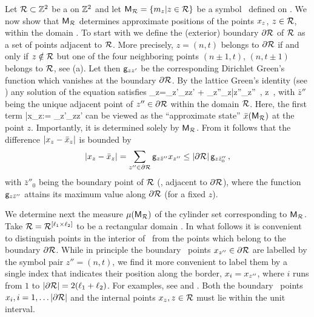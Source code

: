\documentclass[12pt]{iopart}
\begin{document}
Let $\mathcal{R}\subset\mathbb{Z}^2$ be a  on $\mathbb{Z}^2$ and
let ${\mathsf{M}_{\mathcal{R}}}=\{{m_{z}}| z\in \mathcal{R}\}$ be a symbol \brick\ defined on \R. We
now show that ${\mathsf{M}_{\mathcal{R}}}$ determines approximate positions of the points
$x_z$, $z\in\mathcal{R}$, within the domain \R. To start with we define the
(exterior) boundary $\partial\mathcal{R}$ of $\mathcal{R}$ as a set of points adjacent to
$\mathcal{R}$. More precisely, $z=(n,t)$ belongs to $\partial\mathcal{R}$ if and only if
$z\notin \mathcal{R}$ but one of the four neighboring points $(n\pm 1,t)$, $(n,
t\pm 1)$ belongs to $\mathcal{R}$, see (a). Let then
$\mathsf{g}_{zz'}$ be the corresponding Dirichlet Green's function which
vanishes at the boundary $\partial\mathcal{R}$.
By the lattice Green's identity (see ) any
solution of the equation  satisfies
\beq
 \ssp_z=\sum_{z'\in \R}\gd_{zz'} 
 + \sum_{z''\in\partial \R}\gd_{z\bar{z}''}\ssp_{z''}
 \,, \qquad  z\in \R
 \,,
with $\bar{z}''$ being the unique adjacent point of $z''\in \partial \R$
within the domain $\R$. Here, the first term
\beq
\bar{x}_z:= \sum_{z'\in \R}\gd_{zz'} 
can be viewed as the ``approximate {\spt} state''
$\bar{x}({\Mm_\R})$ at the point $z$. Importantly, it  is
determined solely by $\Mm_{\R}$. From  it
follows that the difference $|\ssp_z -\bar{x}_z|$ is bounded by
\[
|\ssp_z -\bar{x}_z|
= \sum_{z''\in\partial \R}\gd_{z\bar{z}''}\ssp_{z''}
  \leq  |\partial \R|\,  \gd_{z\bar{z}''_{0}}
\,,
\]
with $\bar{z}''_{0}$ being the boundary point of $\mathcal{R}$
(\ie, adjacent to $\partial \mathcal{R}$), where the function $\mathsf{g}_{z
\bar{z}''}$ attains its maximum value along $\partial \mathcal{R}$ (for a fixed
$z$).

We determine next the measure ${\mu}({\mathsf{M}_{\mathcal{R}}})$ of the cylinder set
corresponding to ${\mathsf{M}_{\mathcal{R}}}$. Take
\(
\mathcal{R} = \mathcal{R}^{[\ell_1\times\ell_2]}
\)
to be a  rectangular domain . In what follows it is
convenient to distinguish   points in the interior of \R\  from the
points  which belong to the boundary $\partial \mathcal{R}$. While in principle
the boundary \statesp\ points $x_{z''}\in\partial \mathcal{R}$ are labelled by
the symbol pair $z''=(n,t)$, we find it more convenient to label them by
a single index that indicates their position along the border, $x_{i}
= x_{z''}$, where $i$ runs from $1$ to
${|\partial\mathcal{R}|}=2(\ell_1+\ell_2)$. For examples, see
 and . Both
the boundary \statesp\ points $x_i, i=1,\dots {\ensuremath{|\partial \mathcal{R}|}}$ and
the internal points $x_{z}, z\in\mathcal{R}$ must lie within the unit interval.
\end{document}
